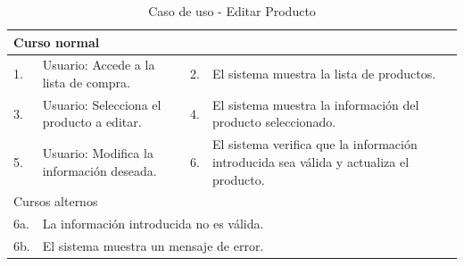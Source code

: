 \begin{table}[H]
    \centering
    \begin{tabular}{| m{} | m{} | m{} | m{} |}
        \hline
        \multicolumn{4}{|m{0.9\textwidth}|}{Curso normal} \\ 
        \hline
        1. & Usuario: Accede a la lista de compra. 
        & 2. & El sistema muestra la lista de productos. \\ 
        \hline
        3. & Usuario: Selecciona el producto a editar. 
        & 4. & El sistema muestra la información del producto seleccionado. \\ 
        \hline
        5. & Usuario: Modifica la información deseada. 
        & 6. & El sistema verifica que la información introducida sea válida y actualiza el producto. \\ 
        \hline
        \multicolumn{4}{|m{0.9\textwidth}|}{Cursos alternos} \\ 
        \hline 
        6a. & \multicolumn{3}{l|}{La información introducida no es válida.} \\ 
        \hline
        6b. & \multicolumn{3}{l|}{El sistema muestra un mensaje de error.} \\ 
        \hline
    \end{tabular}
    \caption{Caso de uso - Editar Producto}
\end{table}
